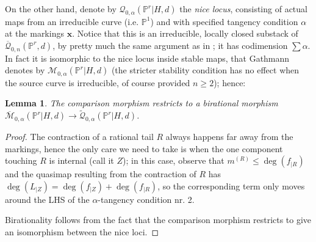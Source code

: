 \documentclass[11pt]{amsart}
\newcommand{\M}[4]{\overline{\mathcal M}_{#1,#2}(#3,#4)}
\newcommand{\Q}[4]{\overline{\mathcal Q}_{#1,#2}(#3,#4)}
\newcommand{\Qt}[4]{\widetilde{\mathcal Q}_{#1,#2}(#3,#4)}
\newcommand{\PP}{\mathbb P}
\renewcommand{\to}{\rightarrow}
\theoremstyle{plain}
\newtheorem{lem}[thm]{Lemma}
\theoremstyle{definition}
\begin{document}
On the other hand, denote by $\mathcal Q_{0,\alpha}(\PP^r|H,d)$ the \emph{nice locus}, consisting of actual maps from an irreducible curve (i.e. $\PP^1$) and with specified tangency condition $\alpha$ at the markings $\mathbf x$. Notice that this is an irreducible, locally closed substack of $\Q{0}{n}{\PP^r}{d}$, by pretty much the same argument as in \cite[Lemma 1.8]{Ga}; it has codimension $\sum\alpha$. In fact it is isomorphic to the nice locus inside stable maps, that Gathmann denotes by $\mathcal M_{0,\alpha}(\PP^r|H,d)$ \cite[Def. 1.6]{Ga} (the stricter stability condition has no effect when the source curve is irreducible, of course provided $n\geq2$); hence:

\begin{lem}\label{lem:comparison}
The comparison morphism restricts to a birational morphism $\M{0}{\alpha}{\PP^r|H}{d}\to \Qt{0}{\alpha}{\PP^r|H}{d}$.
\end{lem}
\begin{proof}
The contraction of a rational tail $R$ always happens far away from the markings, hence the only care we need to take is when the one component touching $R$ is internal (call it $Z$); in this case, observe that $m^{(R)}\leq\deg(f_{|R})$ and the quasimap resulting from the contraction of $R$ has $\deg(L_{|Z})=\deg(f_{|Z})+\deg(f_{|R})$, so the corresponding term only moves around the LHS of the $\alpha$-tangency condition nr. 2.

Birationality follows from the fact that the comparison morphism restricts to give an isomorphism between the nice loci.
\end{proof}
\end{document}
